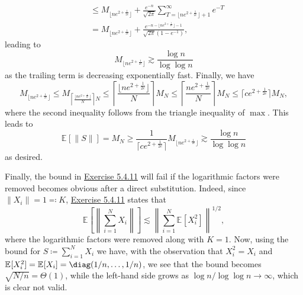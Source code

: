 \begin{answer}
\begin{enumerate}[(a)]
\begin{explanation}
\begin{align*}
				       & \leq M_{\lfloor n e^{2 + \frac{1}{2e}} \rfloor } + \frac{e^{-n}}{\sqrt{2\pi } } \sum_{T= \lfloor n e^{2 + \frac{1}{2e}} \rfloor + 1}^{\infty} e^{-T}                                                                \\
				       & = M_{\lfloor n e^{2 + \frac{1}{2e}} \rfloor } + \frac{e^{-n - \lfloor n e^{2 + \frac{1}{2e}} \rfloor - 1}}{\sqrt{2\pi } (1 - e^{-1})},
			      \end{align*}
			      leading to
			      \[
				      M_{\lfloor n e^{2 + \frac{1}{2e}} \rfloor}
				      \gtrsim \frac{\log n}{\log \log n}
			      \]
			      as the trailing term is decreasing exponentially fast. Finally, we have
			      \[
				      M_{\lfloor n e^{2 + \frac{1}{2e}} \rfloor}
				      \leq M_{\left\lceil \frac{\lfloor n e^{2 + \frac{1}{2e}} \rfloor}{N} \right\rceil N}
				      \leq \left\lceil \frac{\lfloor n e^{2 + \frac{1}{2e}} \rfloor}{N} \right\rceil M_N
				      \leq \left\lceil \frac{n e^{2 + \frac{1}{2e}}}{N} \right\rceil M_N
				      \leq \lceil c e^{2 + \frac{1}{2e}} \rceil M_N,
			      \]
			      where the second inequality follows from the triangle inequality of \(\max \). This leads to
			      \[
				      \mathbb{E}_{}[\lVert S \rVert ]
				      = M_N
				      \geq \frac{1}{\lceil c e^{2 + \frac{1}{2e}} \rceil } M_{\lfloor n e^{2 + \frac{1}{2e}} \rfloor }
				      \gtrsim \frac{\log n}{\log \log n}
			      \]
			      as desired.
		      \end{explanation}

		      Finally, the bound in \hyperref[ex5.4.11]{Exercise 5.4.11} will fail if the logarithmic factors were removed becomes obvious after a direct substitution. Indeed, since \(\lVert X_i \rVert = 1 \eqqcolon K\), \hyperref[ex5.4.11]{Exercise 5.4.11} states that
		      \[
			      \mathbb{E}_{}\left[\left\lVert \sum_{i=1}^{N} X_i \right\rVert \right]
			      \lesssim \left\lVert \sum_{i=1}^{N} \mathbb{E}_{}[X_i^2] \right\rVert ^{1 / 2} ,
		      \]
		      where the logarithmic factors were removed along with \(K = 1\). Now, using the bound for \(S \coloneqq \sum_{i=1}^{N} X_i\) we have, with the observation that \(X_i^2 = X_i\) and \(\mathbb{E}_{}[X_i^2] = \mathbb{E}_{}[X_i] = \diag (1 / n, \dots , 1 / n)\), we see that the bound becomes \(\sqrt{N / n} = \Theta (1)\), while the left-hand side grows as \(\log n / \log \log n \to \infty \), which is clear not valid.
	\end{enumerate}
\end{answer}

